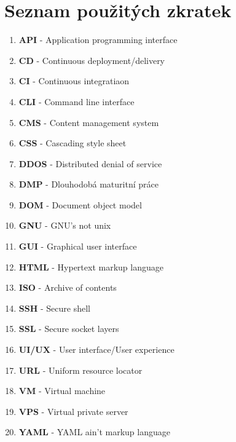 \documentclass[12pt,a4paper]{report}
\begin{document}
  \section{Seznam použitých zkratek}
  \begin{enumerate}
    \item \textbf{API} - Application programming interface
    \item \textbf{CD} - Continuous deployment/delivery
    \item \textbf{CI} - Continuous integratiaon
    \item \textbf{CLI} - Command line interface
    \item \textbf{CMS} - Content management system
    \item \textbf{CSS} - Cascading style sheet
    \item \textbf{DDOS} - Distributed denial of service
    \item \textbf{DMP} - Dlouhodobá maturitní práce
    \item \textbf{DOM} - Document object model
    \item \textbf{GNU} - GNU's not unix
    \item \textbf{GUI} - Graphical user interface
    \item \textbf{HTML} - Hypertext markup language
    \item \textbf{ISO} - Archive of contents
    \item \textbf{SSH} - Secure shell
    \item \textbf{SSL}  - Secure socket layers
    \item \textbf{UI/UX} - User interface/User experience
    \item \textbf{URL} - Uniform resource locator
    \item \textbf{VM} - Virtual machine
    \item \textbf{VPS} - Virtual private server
    \item \textbf{YAML} - YAML ain't markup language
  
  \end{enumerate}

  
\end{document}
